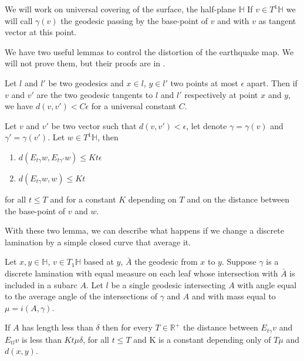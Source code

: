 We will work on universal covering of the surface, the half-plane $\mathbb{H}$
If $v \in T^1 \mathbb{H}$ we will call $\gamma(v)$ the geodesic passing by the base-point of $v$ and with $v$ as tangent vector at this point.

We have two useful lemmas to control the distortion of the earthquake map. We will not prove them, but their proofs are in \cite{NielsenRealizationPro}.

\begin{lem}\label{DisVec}
Let $l$ and $l'$ be two geodesics and $x \in l$, $y \in l'$ two points at most $\epsilon$ apart. Then if $v$ and $v'$ are the two geodesic tangents to $l$ and $l'$ respectively at point $x$ and $y$,
we have $d(v,v')<C \epsilon$ for a universal constant $C$.
\end{lem}

\begin{lem}\label{DisShe}
Let $v$ and $v'$ be two vector such that $d(v,v') < \epsilon$, let denote $\gamma=\gamma(v)$ and $\gamma'=\gamma(v')$. Let $w\in T^1 \mathbb{H}$, then \begin{enumerate}
\item $d(E_{t \gamma}w,E_{t \gamma'}w) \leq Kt \epsilon$
\item $d(E_{t \gamma}w,w) \leq Kt $
\end{enumerate}
for all $t\leq T$ and for a constant $K$ depending on $T$ and on the distance between the base-point of $v$ and $w$.
\end{lem}

With these two lemma, we can describe what happens if we change a discrete lamination by a simple closed curve that average it.

\begin{lem}
Let $x,y \in \mathbb{H}$, $v\in T_1 \mathbb{H}$ based at $y$, $\bar{A}$ the geodesic from $x$ to $y$. Suppose $\gamma$ is a discrete lamination with equal measure on each leaf whose intersection with $\bar{A}$ is included in a subarc $A$. Let $l$ be a single geodesic intersecting $A$ with angle equal to the average angle of the intersections of $\gamma$ and $A$ and with mass equal to $\mu=i(A,\gamma)$.

If $A$ has length less than $\delta$ then for every $T\in \mathbb{R}^+$ the distance between $E_{t\gamma}v$ and $E_{t l}v$ is less than $Kt \mu \delta$, for all $t \leq T$ and K is a constant depending only of $T \mu$ and $d(x,y)$.
\end{lem} %

